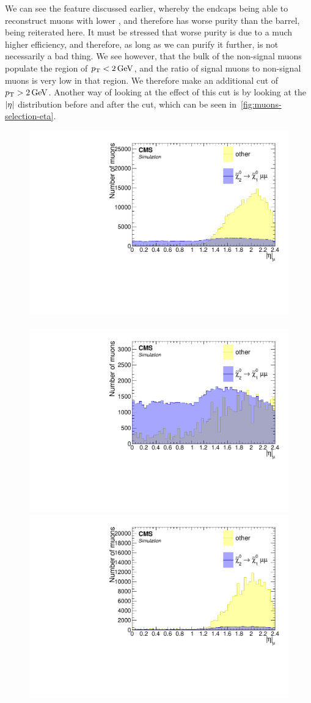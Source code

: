We can see the feature discussed earlier, whereby the endcaps being able to reconstruct muons with lower \pt, and therefore has worse purity than the barrel, being reiterated here. It must be stressed that worse purity is due to a much higher efficiency, and therefore, as long as we can purify it further, is not necessarily a bad thing. We see however, that the bulk of the non-signal muons populate the region of $p_{\mathrm{T}}<2\,\text{Ge\hspace{-.08em}V}$, and the ratio of signal muons to non-signal muons is very low in that region. We therefore make an additional cut of $p_{\mathrm{T}}>2\,\text{Ge\hspace{-.08em}V}$. Another way of looking at the effect of this cut is by looking at the $\lvert \eta \rvert$ distribution before and after the \pt cut, which can be seen in~\ref{fig:muons-selection-eta}.

\begin{figure}[!htb]
\centering
\includegraphics[width=0.48\linewidth]{plots/lepton_selection/lepton_selection_dm5p63/none_Muons_Eta.pdf} \,
\includegraphics[width=0.48\linewidth]{plots/lepton_selection/lepton_selection_dm5p63/none_Muons_Eta_after_pt.pdf} \\
\includegraphics[width=0.48\linewidth]{plots/lepton_selection/lepton_selection_dm1p92/none_Muons_Eta.pdf}  \,

\end{figure}
